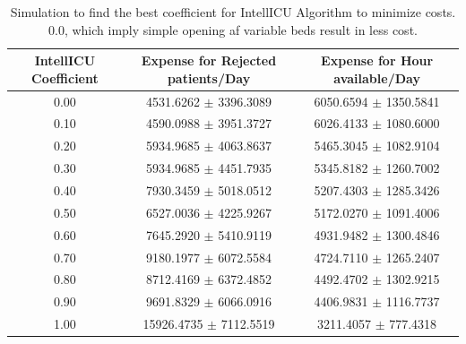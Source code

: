 \documentclass[12pt]{article}
\begin{document}
\begin{table}[H]
\captionsetup{skip=10pt}
\centering
\caption{Simulation to find the best coefficient for IntellICU Algorithm to minimize costs. 0.0, which imply simple opening af variable beds result in less cost.}
\label{tab:bestCoefVarBedSimulationCost}
\begin{tabular}{ccc}
\hline
IntellICU Coefficient & Expense for Rejected patients/Day & Expense for Hour available/Day \\
\hline
\rowcolor{Gray}
0.00 & 4531.6262 $\pm$ 3396.3089 & 6050.6594 $\pm$ 1350.5841 \\
0.10 & 4590.0988 $\pm$ 3951.3727 & 6026.4133 $\pm$ 1080.6000 \\
0.20 & 5934.9685 $\pm$ 4063.8637 & 5465.3045 $\pm$ 1082.9104 \\
0.30 & 5934.9685 $\pm$ 4451.7935 & 5345.8182 $\pm$ 1260.7002 \\
0.40 & 7930.3459 $\pm$ 5018.0512 & 5207.4303 $\pm$ 1285.3426 \\ 
0.50 & 6527.0036 $\pm$ 4225.9267 & 5172.0270 $\pm$ 1091.4006 \\
0.60 & 7645.2920 $\pm$ 5410.9119 & 4931.9482 $\pm$ 1300.4846 \\
0.70 & 9180.1977 $\pm$ 6072.5584 & 4724.7110 $\pm$ 1265.2407 \\
0.80 & 8712.4169 $\pm$ 6372.4852 & 4492.4702 $\pm$ 1302.9215 \\
0.90 & 9691.8329 $\pm$ 6066.0916 & 4406.9831 $\pm$ 1116.7737 \\
1.00 & 15926.4735 $\pm$ 7112.5519 & 3211.4057 $\pm$ 777.4318 \\
\hline
\end{tabular}
\end{table}
\end{document}
